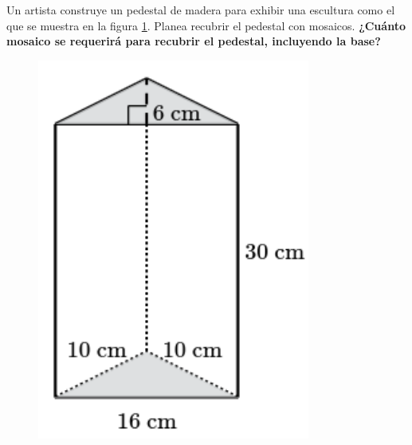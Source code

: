 \question[10] Un artista construye un pedestal de madera para exhibir una escultura como el que se muestra en la figura \ref{fig:prob_verb_superficie_01}.
Planea recubrir el pedestal con mosaicos.
\textbf{¿Cuánto mosaico se requerirá para recubrir el pedestal, incluyendo la base?}

\begin{minipage}{0.3\linewidth}
    \begin{figure}[H]
        \begin{center}
            \includegraphics[width=0.8\textwidth]{../images/prob_verb_superficie_01}
        \end{center}
        \caption{}
        \label{fig:prob_verb_superficie_01}
    \end{figure}
\end{minipage}
\begin{minipage}{0.7\linewidth}
    \begin{solutionbox}{6cm}
    \end{solutionbox}
\end{minipage}